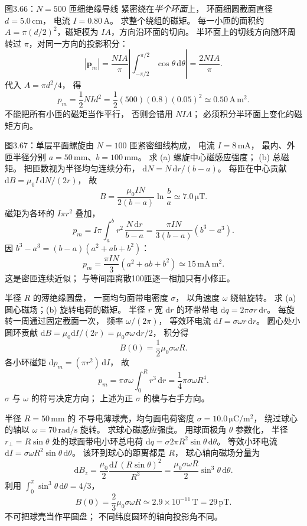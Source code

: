 图3.66：$N=500$ 匝细绝缘导线
紧密绕在\emph{半个环面}上，
环面细圆截面直径
$d=5.0\,\mathrm{cm}$，
电流 $I=0.80\,\mathrm A$。
求整个绕组的磁矩。
\exsolution
每一小匝的面积约
$A=\pi(d/2)^2$，磁矩模为
$IA$，方向沿环面的切向。
半环面上的切线方向随环周
转过 $\pi$，对同一方向的投影积分：
\[
|\bm p_m|=
\frac{NIA}{\pi}
\left|\int_{-\pi/2}^{\pi/2}
\cos\theta\,\mathrm d\theta\right|
=\frac{2NIA}{\pi}.
\]
代入
$A=\pi d^2/4$，
得
\[
\boxed{p_m=\frac12NId^2
=\frac12(500)(0.8)(0.05)^2
\simeq0.50\,\mathrm{A\,m^2}}.
\]
\excheck 不能把所有小匝的磁矩当作平行，
否则会错用 $NIA$；
必须积分半环面上变化的磁矩方向。

图3.67：单层平面螺旋由
$N=100$ 匝紧密细线构成，
电流 $I=8\,\mathrm{mA}$，
最内、外匝半径分别
$a=50\,\mathrm{mm}$、$b=100\,\mathrm{mm}$。
求 (a) 螺旋中心磁感应强度；
(b) 总磁矩。
\exsolution
把匝数视为半径均匀连续分布，
$\mathrm dN=N\,\mathrm dr/(b-a)$。
每匝在中心贡献
$\mathrm dB=\mu_0I\,\mathrm dN/(2r)$，
故
\[
\boxed{B=
\frac{\mu_0IN}{2(b-a)}\ln\frac ba
\simeq7.0\,\mathrm{\mu T}}.
\]
磁矩为各环的
$I\pi r^2$ 叠加，
\[
p_m=I\pi\int_a^b r^2\,
\frac{N\,\mathrm dr}{b-a}
=\frac{\pi IN}{3(b-a)}(b^3-a^3).
\]
因 $b^3-a^3=(b-a)(a^2+ab+b^2)$：
\[
\boxed{p_m=
\frac{\pi IN}{3}(a^2+ab+b^2)
\simeq15\,\mathrm{mA\,m^2}}.
\]
\excheck 这是密匝连续近似；
与等间距离散100匝逐一相加只有小修正。

半径 $R$ 的薄绝缘圆盘，
一面均匀面带电密度 $\sigma$，
以角速度 $\omega$ 绕轴旋转。
求 (a) 圆心磁场；(b) 旋转电荷的磁矩。
\exsolution
半径 $r$ 宽 $\mathrm dr$
的环带带电
$\mathrm dq=2\pi\sigma r\,\mathrm dr$。
每旋转一周通过固定截面一次，
频率 $\omega/(2\pi)$，
等效环电流
$\mathrm dI=\sigma\omega r\,\mathrm dr$。
圆心处小圆环贡献
$\mathrm dB=\mu_0\mathrm dI/(2r)
=\mu_0\sigma\omega\,\mathrm dr/2$，
积分得
\[
\boxed{B(0)=\frac12\mu_0\sigma\omega R}.
\]
各小环磁矩
$\mathrm dp_m=(\pi r^2)\,\mathrm dI$，
故
\[
\boxed{p_m=\pi\sigma\omega\int_0^Rr^3\,\mathrm dr
=\frac14\pi\sigma\omega R^4}.
\]
\excheck $\sigma$ 与 $\omega$
的符号决定方向；
上述为正 $\sigma$ 的模与右手方向。

半径 $R=50\,\mathrm{mm}$ 的
不导电薄球壳，均匀面电荷密度
$\sigma=10.0\,\mathrm{\mu C/m^2}$，
绕过球心的轴以
$\omega=70\,\mathrm{rad/s}$ 旋转。
求球心磁感应强度。
\exsolution
用球面极角 $\theta$ 参数化，
半径 $r_\perp=R\sin\theta$
处的球面带电小环总电荷
$\mathrm dq=\sigma2\pi R^2\sin\theta\,\mathrm d\theta$。
等效小环电流
$\mathrm dI=\sigma\omega R^2\sin\theta\,\mathrm d\theta$。
该环到球心的距离都是 $R$，
球心轴向磁场分量为
\[
\mathrm dB_z=
\frac{\mu_0}{2}\frac{\mathrm dI\,(R\sin\theta)^2}
{R^3}
=\frac{\mu_0\sigma\omega R}{2}
\sin^3\theta\,\mathrm d\theta.
\]
利用
$\int_0^\pi\sin^3\theta\,\mathrm d\theta=4/3$，
\[
\boxed{B(0)=\frac23\mu_0\sigma\omega R
\simeq2.9\times10^{-11}\,\mathrm T=29\,\mathrm{pT}}.
\]
\excheck 不可把球壳当作平圆盘；
不同纬度圆环的轴向投影角不同。

